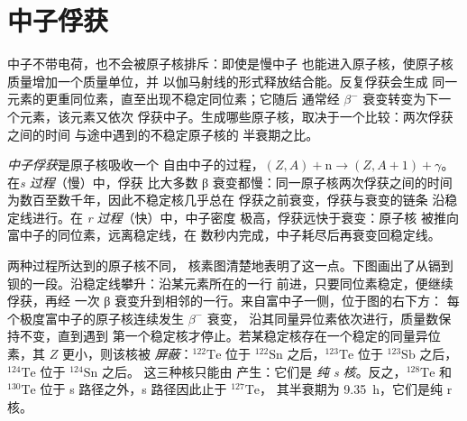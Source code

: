 \section{中子俘获}\label{sec:b3:origin-of-elements:neutrons}

中子不带电荷，也不会被原子核排斥：即使是慢中子
也能进入原子核，使原子核质量增加一个质量单位，并
以伽马射线的形式释放结合能。反复俘获会生成
同一元素的更重同位素，直至出现不稳定同位素；它随后
通常经 $\beta^-$ 衰变转变为下一个元素，该元素又依次
俘获中子。生成哪些原子核，取决于一个比较：两次俘获之间的时间
与途中遇到的不稳定原子核的
半衰期之比。

\begin{definition}[中子俘获；s 过程；r 过程]\label{def:b3:origin-of-elements:s-process}
\emph{中子俘获}是原子核吸收一个
自由中子的过程，$(Z, A) + \mathrm{n} \to (Z, A+1) + \gamma$。
在\emph{s 过程}（慢）中，俘获
比大多数 β 衰变都慢：同一原子核两次俘获之间的时间
为数百至数千年，因此不稳定核几乎总在
俘获之前衰变，俘获与衰变的链条
沿稳定线进行。在
\emph{r 过程}（快）中，中子密度
极高，俘获远快于衰变：原子核
被推向富中子的同位素，远离稳定线，在
数秒内完成，中子耗尽后再衰变回稳定线。
\end{definition}

两种过程所达到的原子核不同，
核素图清楚地表明了这一点。下图画出了从镉到
钡的一段。沿稳定线攀升：沿某元素所在的一行
前进，只要同位素稳定，便继续俘获，再经
一次 β 衰变升到相邻的一行。来自富中子一侧，位于图的右下方：
每个极度富中子的原子核连续发生 $\beta^-$ 衰变，
沿其同量异位素依次进行，质量数保持不变，直到遇到
第一个稳定核才停止。若某稳定核存在一个稳定的同量异位素，其
$Z$ 更小，则该核被 \emph{屏蔽}：$^{122}\mathrm{Te}$
位于 $^{122}\mathrm{Sn}$ 之后，$^{123}\mathrm{Te}$ 位于
$^{123}\mathrm{Sb}$ 之后，$^{124}\mathrm{Te}$ 位于 $^{124}\mathrm{Sn}$ 之后。
这三种核只能由 产生：它们是
\emph{纯 s 核}。反之，$^{128}\mathrm{Te}$ 和 $^{130}\mathrm{Te}$
位于 s 路径之外，s 路径因此止于 $^{127}\mathrm{Te}$，
其半衰期为 \qty{9.35}{h}，它们是纯 r 核。

